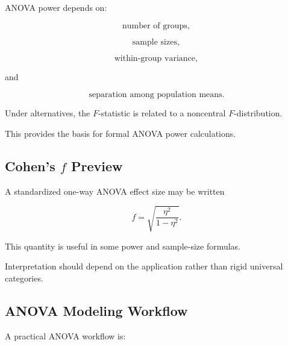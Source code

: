 ANOVA power depends on:

\[
\boxed{
\text{number of groups},
}
\]

\[
\boxed{
\text{sample sizes},
}
\]

\[
\boxed{
\text{within-group variance},
}
\]

and

\[
\boxed{
\text{separation among population means}.
}
\]

Under alternatives, the \(F\)-statistic is related to a noncentral
\(F\)-distribution.

This provides the basis for formal ANOVA power calculations.

\subsection{Cohen's \(f\) Preview}
\label{subsec:cohens-f-anova}

A standardized one-way ANOVA effect size may be written

\[
\boxed{
f
=
\sqrt{
\frac{
\eta^2
}{
1-\eta^2
}
}.
}
\]

This quantity is useful in some power and sample-size formulas.

Interpretation should depend on the application rather than rigid
universal categories.

\subsection{ANOVA Modeling Workflow}
\label{subsec:anova-workflow}

A practical ANOVA workflow is:

